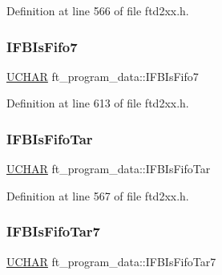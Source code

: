Definition at line 566 of file ftd2xx.\+h.

\mbox{\label{structft__program__data_a73fc4f0b76da0dee036714023f45418e}} 
\subsubsection{\texorpdfstring{I\+F\+B\+Is\+Fifo7}{IFBIsFifo7}}
{\footnotesize\ttfamily \hyperlink{CatCaloProto40MHz_2inc_2WinTypes_8h_a4f4bb67531a9bf6f0b9c6ad76aeba587}{U\+C\+H\+AR} ft\+\_\+program\+\_\+data\+::\+I\+F\+B\+Is\+Fifo7}



Definition at line 613 of file ftd2xx.\+h.

\mbox{\label{structft__program__data_a1ed18c9dd5cc96d1ae96320ef2115b8b}} 
\subsubsection{\texorpdfstring{I\+F\+B\+Is\+Fifo\+Tar}{IFBIsFifoTar}}
{\footnotesize\ttfamily \hyperlink{CatCaloProto40MHz_2inc_2WinTypes_8h_a4f4bb67531a9bf6f0b9c6ad76aeba587}{U\+C\+H\+AR} ft\+\_\+program\+\_\+data\+::\+I\+F\+B\+Is\+Fifo\+Tar}



Definition at line 567 of file ftd2xx.\+h.

\mbox{\label{structft__program__data_a3c52ca4fac055f6710035176b61344a0}} 
\subsubsection{\texorpdfstring{I\+F\+B\+Is\+Fifo\+Tar7}{IFBIsFifoTar7}}
{\footnotesize\ttfamily \hyperlink{CatCaloProto40MHz_2inc_2WinTypes_8h_a4f4bb67531a9bf6f0b9c6ad76aeba587}{U\+C\+H\+AR} ft\+\_\+program\+\_\+data\+::\+I\+F\+B\+Is\+Fifo\+Tar7}



